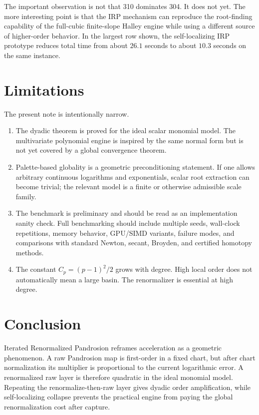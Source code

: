 \documentclass[11pt]{article}
\begin{document}
The important observation is not that 310 dominates 304.  It does not yet.  The more interesting point is that the IRP mechanism can reproduce the root-finding capability of the full-cubic finite-slope Halley engine while using a different source of higher-order behavior.  In the largest row shown, the self-localizing IRP prototype reduces total time from about $26.1$ seconds to about $10.3$ seconds on the same instance.

\section{Limitations}
The present note is intentionally narrow.
\begin{enumerate}[leftmargin=*]
  \item The dyadic theorem is proved for the ideal scalar monomial model.  The multivariate polynomial engine is inspired by the same normal form but is not yet covered by a global convergence theorem.
  \item Palette-based globality is a geometric preconditioning statement.  If one allows arbitrary continuous logarithms and exponentials, scalar root extraction can become trivial; the relevant model is a finite or otherwise admissible scale family.
  \item The benchmark is preliminary and should be read as an implementation sanity check.  Full benchmarking should include multiple seeds, wall-clock repetitions, memory behavior, GPU/SIMD variants, failure modes, and comparisons with standard Newton, secant, Broyden, and certified homotopy methods.
  \item The constant $C_p=(p-1)^2/2$ grows with degree.  High local order does not automatically mean a large basin.  The renormalizer is essential at high degree.
\end{enumerate}

\section{Conclusion}
Iterated Renormalized Pandrosion reframes acceleration as a geometric phenomenon.  A raw Pandrosion map is first-order in a fixed chart, but after chart normalization its multiplier is proportional to the current logarithmic error.  A renormalized raw layer is therefore quadratic in the ideal monomial model.  Repeating the renormalize-then-raw layer gives dyadic order amplification, while self-localizing collapse prevents the practical engine from paying the global renormalization cost after capture.
\end{document}
